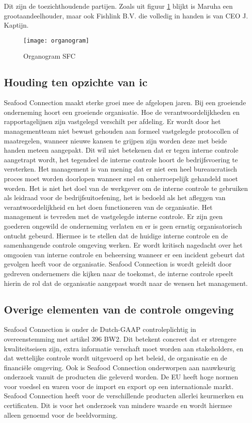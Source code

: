 Dit zijn de toezichthoudende partijen. Zoals uit figuur \ref{fig:organogram} blijkt is Maruha een grootaandeelhouder, maar ook Fishlink B.V. die volledig in handen is van CEO J. Kaptijn.

\begin{figure}[!h]
    \centering
    \texttt{[image: organogram]}
    \caption{Organogram SFC \citep{aoibsfc}}
    \label{fig:organogram}
\end{figure}


\subsection{Houding ten opzichte van \gls{ic}}
Seafood Connection maakt sterke groei mee de afgelopen jaren. Bij een groeiende onderneming hoort een groeiende organisatie. Hoe de verantwoordelijkheden en rapportagelijnen zijn vastgelegd verschilt per afdeling. Er wordt door het managementteam niet bewust gehouden aan formeel vastgelegde protocollen of maatregelen, wanneer nieuwe kansen te grijpen zijn worden deze met beide handen meteen aangepakt. Dit wil niet betekenen dat er tegen interne controle aangetrapt wordt, het tegendeel de interne controle hoort de bedrijfsvoering te versterken. Het management is van mening dat er niet een heel bureaucratisch proces moet worden doorlopen wanneer snel en onherroepelijk gehandeld moet worden. Het is niet het doel van de werkgever om de interne controle te gebruiken als leidraad voor de bedrijfsuitoefening, het is bedoeld als het afleggen van verantwoordelijkheid en het doen functioneren van de organisatie. Het management is tevreden met de vastgelegde interne controle. Er zijn geen goederen ongewild de onderneming verlaten en er is geen ernstig organisatorisch ontucht gebeurd. Hiermee is te stellen dat de huidige interne controle en de samenhangende controle omgeving werken. Er wordt kritisch nagedacht over het omgooien van interne controle en beheersing wanneer er een incident gebeurt dat gevolgen heeft voor de organisatie. Seafood Connection is wordt geleidt door gedreven ondernemers die kijken naar de toekomst, de interne controle speelt hierin de rol dat de organisatie aangepast wordt naar de wensen het management. \citep{quickscan}

\medskip
\subsection{Overige elementen van de controle omgeving}
Seafood Connection is onder de Dutch-GAAP controleplichtig in overeenstemming met artikel 396 BW2. Dit betekent concreet dat er strengere kwaliteitseisen zijn, extra informatie verschaft moet worden aan stakeholders, en dat wettelijke controle wordt uitgevoerd op het beleid, de organisatie en de financiële omgeving. Ook is Seafood Connection onderworpen aan nauwkeurig onderzoek vanuit de producten die geleverd worden. De EU heeft hoge normen voor voedsel en waren voor de import en export op een internationale markt. Seafood Connection heeft voor de verschillende producten allerlei keurmerken en certificaten. Dit is voor het onderzoek van mindere waarde en wordt hiermee alleen genoemd voor de beeldvorming.


